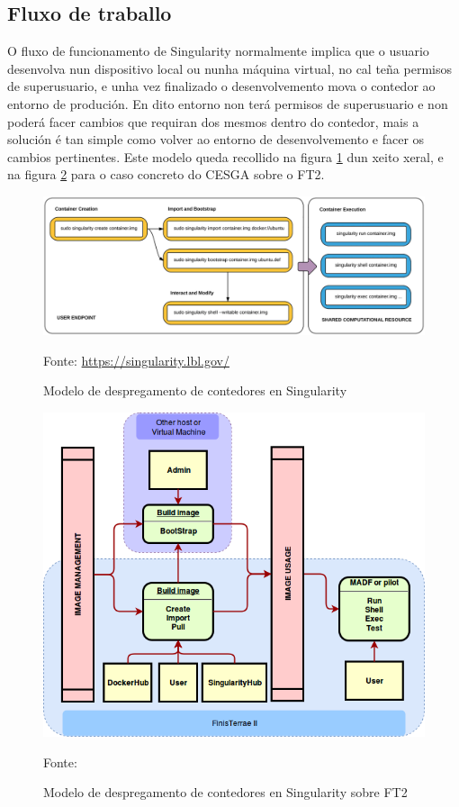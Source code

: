 \subsection{Fluxo de traballo}

O fluxo de funcionamento de Singularity normalmente implica que o usuario desenvolva nun dispositivo local ou nunha máquina virtual, no cal teña permisos de superusuario, e unha vez finalizado o desenvolvemento mova o contedor ao entorno de produción. En dito entorno non terá permisos de superusuario e non poderá facer cambios que requiran dos mesmos dentro do contedor, mais a solución é tan simple como volver ao entorno de desenvolvemento e facer os cambios pertinentes. Este modelo queda recollido na figura \ref{singularityWorkflow} dun xeito xeral, e na figura \ref{singularity-workflow} para o caso concreto do \gls{CESGA} sobre o \gls{FT2}.

\begin{figure}
\centerline{\includegraphics[width=15cm]{figuras/singularityWorkflow}}
\caption{Modelo de despregamento de contedores en Singularity}
\medskip
\small
\centerline{Fonte: \url{https://singularity.lbl.gov/}}
\label{singularityWorkflow}
\end{figure}

\begin{figure}
\centerline{\includegraphics[width=15cm]{figuras/singularity-workflow.png}}
\caption{Modelo de despregamento de contedores en Singularity sobre \gls{FT2}}
\medskip
\small
\centerline{Fonte: \cite{MSO4SC}}
\label{singularity-workflow}
\end{figure}

